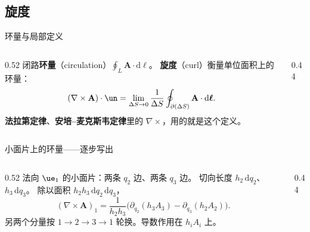 \documentclass[fontset=windows, chinese, 10pt, xcolor=dvipsnames]{beamer}
\begin{document}
\subsection{旋度}

\begin{frame}{环量与局部定义}
  \begin{columns}[c]
    \begin{column}{0.52\textwidth}
      闭路\textbf{环量}（circulation）$\oint_L\mathbf{A}\cdot\mathrm{d}\boldsymbol{\ell}$。
      \textbf{旋度}（curl）衡量单位面积上的环量：
      \begin{equation*}
        (\nabla\times\mathbf{A})\cdot\un
        =\lim_{\Delta S\to 0}\frac{1}{\Delta S}
          \oint_{\partial(\Delta S)}\mathbf{A}\cdot\mathrm{d}\boldsymbol{\ell}.
      \end{equation*}
      \textbf{法拉第定律}、\textbf{安培--麦克斯韦定律}里的 $\nabla\times$，用的就是这个定义。
    \end{column}
    \begin{column}{0.44\textwidth}
      \centering
      \scalebox{0.82}{}
    \end{column}
  \end{columns}
\end{frame}

\begin{frame}{小面片上的环量——逐步写出}
  \begin{columns}[T]
    \begin{column}{0.52\textwidth}
      {\small
      法向 $\ue_1$ 的小面片：两条 $q_2$ 边、两条 $q_3$ 边。
      切向长度 $h_2\,\mathrm{d}q_2$、$h_3\,\mathrm{d}q_3$。
      除以面积 $h_2 h_3\,\mathrm{d}q_2\,\mathrm{d}q_3$，
      \begin{equation*}
        \boxed{\displaystyle
          (\nabla\times\mathbf{A})_1
          =\frac{1}{h_2 h_3}
            \bigl(
              \partial_{q_2}(h_3 A_3)
              -\partial_{q_3}(h_2 A_2)
            \bigr).}
      \end{equation*}
      另两个分量按 $1\to 2\to 3\to 1$ 轮换。导数作用在 $h_i A_i$ 上。}
    \end{column}
    \begin{column}{0.44\textwidth}
      \centering
      \resizebox{\linewidth}{!}{}
    \end{column}
  \end{columns}
\end{frame}
\end{document}
